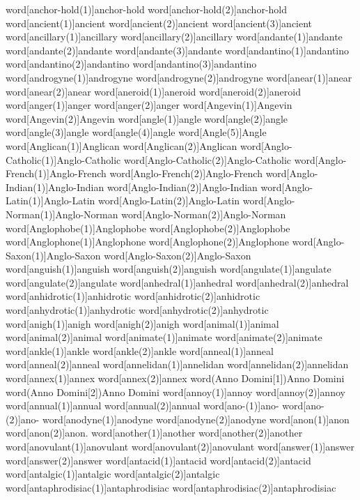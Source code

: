 word[anchor-hold(1)]{anchor-hold}
word[anchor-hold(2)]{anchor-hold}
word[ancient(1)]{ancient}
word[ancient(2)]{ancient}
word[ancient(3)]{ancient}
word[ancillary(1)]{ancillary}
word[ancillary(2)]{ancillary}
word[andante(1)]{andante}
word[andante(2)]{andante}
word[andante(3)]{andante}
word[andantino(1)]{andantino}
word[andantino(2)]{andantino}
word[andantino(3)]{andantino}
word[androgyne(1)]{androgyne}
word[androgyne(2)]{androgyne}
word[anear(1)]{anear}
word[anear(2)]{anear}
word[aneroid(1)]{aneroid}
word[aneroid(2)]{aneroid}
word[anger(1)]{anger}
word[anger(2)]{anger}
word[Angevin(1)]{Angevin}
word[Angevin(2)]{Angevin}
word[angle(1)]{angle}
word[angle(2)]{angle}
word[angle(3)]{angle}
word[angle(4)]{angle}
word[Angle(5)]{Angle}
word[Anglican(1)]{Anglican}
word[Anglican(2)]{Anglican}
word[Anglo-Catholic(1)]{Anglo-Catholic}
word[Anglo-Catholic(2)]{Anglo-Catholic}
word[Anglo-French(1)]{Anglo-French}
word[Anglo-French(2)]{Anglo-French}
word[Anglo-Indian(1)]{Anglo-Indian}
word[Anglo-Indian(2)]{Anglo-Indian}
word[Anglo-Latin(1)]{Anglo-Latin}
word[Anglo-Latin(2)]{Anglo-Latin}
word[Anglo-Norman(1)]{Anglo-Norman}
word[Anglo-Norman(2)]{Anglo-Norman}
word[Anglophobe(1)]{Anglophobe}
word[Anglophobe(2)]{Anglophobe}
word[Anglophone(1)]{Anglophone}
word[Anglophone(2)]{Anglophone}
word[Anglo-Saxon(1)]{Anglo-Saxon}
word[Anglo-Saxon(2)]{Anglo-Saxon}
word[anguish(1)]{anguish}
word[anguish(2)]{anguish}
word[angulate(1)]{angulate}
word[angulate(2)]{angulate}
word[anhedral(1)]{anhedral}
word[anhedral(2)]{anhedral}
word[anhidrotic(1)]{anhidrotic}
word[anhidrotic(2)]{anhidrotic}
word[anhydrotic(1)]{anhydrotic}
word[anhydrotic(2)]{anhydrotic}
word[anigh(1)]{anigh}
word[anigh(2)]{anigh}
word[animal(1)]{animal}
word[animal(2)]{animal}
word[animate(1)]{animate}
word[animate(2)]{animate}
word[ankle(1)]{ankle}
word[ankle(2)]{ankle}
word[anneal(1)]{anneal}
word[anneal(2)]{anneal}
word[annelidan(1)]{annelidan}
word[annelidan(2)]{annelidan}
word[annex(1)]{annex}
word[annex(2)]{annex}
word(Anno Domini[1]){Anno Domini}
word(Anno Domini[2]){Anno Domini}
word[annoy(1)]{annoy}
word[annoy(2)]{annoy}
word[annual(1)]{annual}
word[annual(2)]{annual}
word[ano-(1)]{ano-}
word[ano-(2)]{ano-}
word[anodyne(1)]{anodyne}
word[anodyne(2)]{anodyne}
word[anon(1)]{anon}
word[anon(2)]{anon.}
word[another(1)]{another}
word[another(2)]{another}
word[anovulant(1)]{anovulant}
word[anovulant(2)]{anovulant}
word[answer(1)]{answer}
word[answer(2)]{answer}
word[antacid(1)]{antacid}
word[antacid(2)]{antacid}
word[antalgic(1)]{antalgic}
word[antalgic(2)]{antalgic}
word[antaphrodisiac(1)]{antaphrodisiac}
word[antaphrodisiac(2)]{antaphrodisiac}

